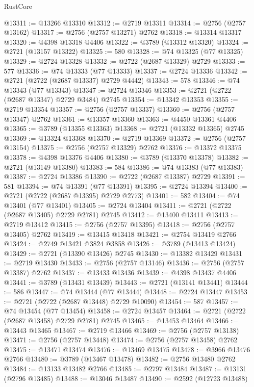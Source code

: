 \begin{lexlean}{RustCore}
\begin{coremodule}
@13311 := @13266 @13310
@13312 := @2719 @13311
@13314 := @2756 (@2757 @13162)
@13317 := @2756 (@2757 @13271) @2762
@13318 := @13314 @13317
@13320 := @4398 @13318 @4406
@13322 := @3789 (@13312 @13320)
@13324 := @2721 (@13157 @13322)
@13325 := 580
@13328 := @74 @13325 (@77 @13325)
@13329 := @2724 @13328
@13332 := @2722 (@2687 @13329) @2729
@13333 := 577
@13336 := @74 @13333 (@77 @13333)
@13337 := @2724 @13336
@13342 := @2721 (@2722 (@2687 @13337) @2729 @4442)
@13343 := 578
@13346 := @74 @13343 (@77 @13343)
@13347 := @2724 @13346
@13353 := @2721 (@2722 (@2687 @13347) @2729 @3484) @2745
@13354 := @13342 @13353
@13355 := @2719 @13354
@13357 := @2756 (@2757 @13337)
@13360 := @2756 (@2757 @13347) @2762
@13361 := @13357 @13360
@13363 := @4450 @13361 @4406
@13365 := @3789 (@13355 @13363)
@13368 := @2721 (@13332 @13365) @2745
@13369 := @13324 @13368
@13370 := @2719 @13369
@13372 := @2756 (@2757 @13154)
@13375 := @2756 (@2757 @13329) @2762
@13376 := @13372 @13375
@13378 := @4398 @13376 @4406
@13380 := @3789 (@13370 @13378)
@13382 := @2721 (@13149 @13380)
@13383 := 584
@13386 := @74 @13383 (@77 @13383)
@13387 := @2724 @13386
@13390 := @2722 (@2687 @13387) @2729
@13391 := 581
@13394 := @74 @13391 (@77 @13391)
@13395 := @2724 @13394
@13400 := @2721 (@2722 (@2687 @13395) @2729 @2773)
@13401 := 582
@13404 := @74 @13401 (@77 @13401)
@13405 := @2724 @13404
@13411 := @2721 (@2722 (@2687 @13405) @2729 @2781) @2745
@13412 := @13400 @13411
@13413 := @2719 @13412
@13415 := @2756 (@2757 @13395)
@13418 := @2756 (@2757 @13405) @2762
@13419 := @13415 @13418
@13421 := @2754 @13419 @2766
@13424 := @2749 @13421 @3824 @3858
@13426 := @3789 (@13413 @13424)
@13429 := @2721 (@13390 @13426) @2745
@13430 := @13382 @13429
@13431 := @2719 @13430
@13433 := @2756 (@2757 @13146)
@13436 := @2756 (@2757 @13387) @2762
@13437 := @13433 @13436
@13439 := @4398 @13437 @4406
@13441 := @3789 (@13431 @13439)
@13443 := @2721 (@13141 @13441)
@13444 := 586
@13447 := @74 @13444 (@77 @13444)
@13448 := @2724 @13447
@13453 := @2721 (@2722 (@2687 @13448) @2729 @10090)
@13454 := 587
@13457 := @74 @13454 (@77 @13454)
@13458 := @2724 @13457
@13464 := @2721 (@2722 (@2687 @13458) @2729 @2781) @2745
@13465 := @13453 @13464
@13466 := @13443 @13465
@13467 := @2719 @13466
@13469 := @2756 (@2757 @13138)
@13471 := @2756 (@2757 @13448)
@13474 := @2756 (@2757 @13458) @2762
@13475 := @13471 @13474
@13476 := @13469 @13475
@13478 := @3966 @13476 @2766
@13480 := @3789 (@13467 @13478)
@13482 := @2756 @13480 @2762
@13484 := @13133 @13482 @2766
@13485 := @2797 @13484
@13487 := @13131 (@2796 @13485)
@13488 := @13046 @13487
@13490 := @2592 (@12723 @13488)

\end{coremodule}
\end{lexlean}

